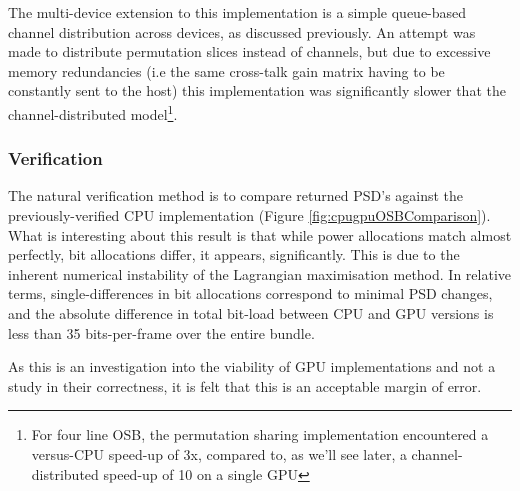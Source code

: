 The multi-device extension to this implementation is a simple queue-based channel distribution across devices, as discussed previously. An attempt was made to distribute permutation slices instead of channels, but due to excessive memory redundancies (i.e the same cross-talk gain matrix having to be constantly sent to the host) this implementation was significantly slower that the channel-distributed model\footnote{For four line OSB, the permutation sharing implementation encountered a versus-CPU speed-up of 3x, compared to, as we'll see later, a channel-distributed speed-up of 10 on a single GPU}.

\subsubsection{Verification}
The natural verification method is to compare returned PSD's against the previously-verified CPU implementation (Figure \ref{fig:cpugpuOSBComparison}). What is interesting about this result is that while power allocations match almost perfectly, bit allocations differ, it appears, significantly. This is due to the inherent numerical instability of the Lagrangian maximisation method. In relative terms, single-differences in bit allocations correspond to minimal PSD changes, and the absolute difference in total bit-load between CPU and GPU versions is less than 35 bits-per-frame over the entire bundle.

As this is an investigation into the viability of GPU implementations and not a study in their correctness, it is felt that this is an acceptable margin of error.

